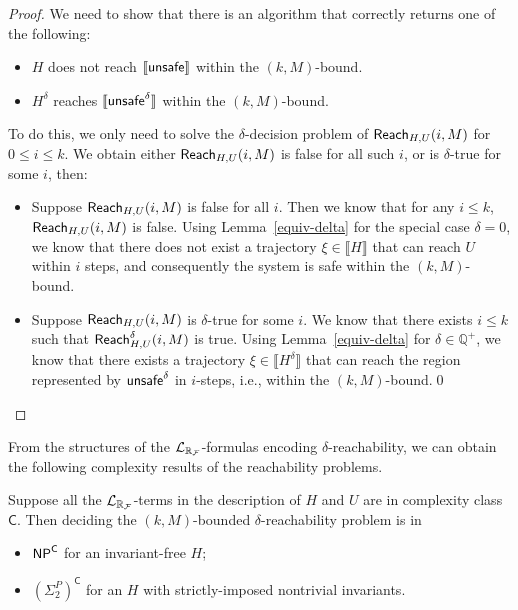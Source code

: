 \documentclass[12pt]{llncs}
\begin{document}
\begin{proof}
We need to show that there is an algorithm that correctly returns one of the following:
\begin{itemize}
\item $H$ does not reach $\llbracket\mathsf{unsafe}\rrbracket$ within the $(k,M)$-bound.
\item $H^{\delta}$ reaches $\llbracket\mathsf{unsafe}^{\delta}\rrbracket$ within the $(k,M)$-bound.
\end{itemize}
To do this, we only need to solve the $\delta$-decision problem of $\mathsf{Reach}_{H,U}(i,M)$ for $0\leq i\leq k$. We obtain either $\mathsf{Reach}_{H,U}(i,M)$ is false for all such $i$, or is $\delta$-true for some $i$, then:
\begin{itemize}
\item Suppose $\mathsf{Reach}_{H,U}(i,M)$ is false for all $i$. Then we know that for any $i\leq k$, $\mathsf{Reach}_{H,U}(i,M)$ is false. Using Lemma~\ref{equiv-delta} for the special case $\delta=0$, we know that there does not exist a trajectory $\xi\in\llbracket H\rrbracket$ that can reach $U$ within $i$ steps, and consequently the system is safe within the $(k,M)$-bound.
\item Suppose $\mathsf{Reach}_{H,U}(i,M)$ is $\delta$-true for some $i$. We know that there exists $i\leq k$ such that $\mathsf{Reach}^{\delta}_{H,U}(i,M)$ is true. Using Lemma~\ref{equiv-delta} for $\delta\in\mathbb{Q}^+$, we know that there exists a trajectory $\xi\in\llbracket H^{\delta}\rrbracket$ that can reach the region represented by $\mathsf{unsafe}^{\delta}$ in $i$-steps, i.e., within the $(k,M)$-bound.\qed
\end{itemize}
\end{proof}
From the structures of the $\mathcal{L}_{\mathbb{R}_{\mathcal{F}}}$-formulas encoding $\delta$-reachability, we can obtain the following complexity results of the reachability problems.
\begin{theorem}[Complexity]
Suppose all the $\mathcal{L}_{\mathbb{R}_{\mathcal{F}}}$-terms in the description of $H$ and $U$ are in complexity class $\mathsf{C}$. Then deciding the $(k,M)$-bounded $\delta$-reachability problem is in
\begin{itemize}
\item $\mathsf{NP}^{\mathsf{C}}$ for an invariant-free $H$;
\item $(\Sigma_2^P)^{\mathsf{C}}$ for an $H$ with strictly-imposed nontrivial invariants.
\end{itemize}
\end{theorem}
\end{document}
